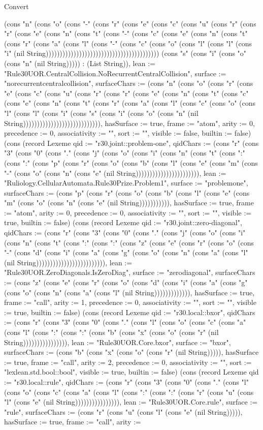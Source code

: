 \begin{lexlean}{Convert}
\begin{semanticmodule}
{(cons "n" (cons "o" (cons "-" (cons "r" (cons "e" (cons "c" (cons "u" (cons "r" (cons "r" (cons "e" (cons "n" (cons "t" (cons "-" (cons "c" (cons "e" (cons "n" (cons "t" (cons "r" (cons "a" (cons "l" (cons "-" (cons "c" (cons "o" (cons "l" (cons "l" (cons "i" (nil String))))))))))))))))))))))))))))))))))))))))) (cons "s" (cons "i" (cons "o" (cons "n" (nil String))))) : (List String)), lean := "Rule30UOR.CentralCollision.NoRecurrentCentralCollision", surface := "norecurrentcentralcollision", surfaceChars := (cons "n" (cons "o" (cons "r" (cons "e" (cons "c" (cons "u" (cons "r" (cons "r" (cons "e" (cons "n" (cons "t" (cons "c" (cons "e" (cons "n" (cons "t" (cons "r" (cons "a" (cons "l" (cons "c" (cons "o" (cons "l" (cons "l" (cons "i" (cons "s" (cons "i" (cons "o" (cons "n" (nil String)))))))))))))))))))))))))))), hasSurface := true, frame := "atom", arity := 0, precedence := 0, associativity := "", sort := "", visible := false, builtin := false}) (cons (record Lexeme {qid := "r30.joint::problem-one", qidChars := (cons "r" (cons "3" (cons "0" (cons "." (cons "j" (cons "o" (cons "i" (cons "n" (cons "t" (cons ":" (cons ":" (cons "p" (cons "r" (cons "o" (cons "b" (cons "l" (cons "e" (cons "m" (cons "-" (cons "o" (cons "n" (cons "e" (nil String))))))))))))))))))))))), lean := "Ruliology.CellularAutomata.Rule30Prize.Problem1", surface := "problemone", surfaceChars := (cons "p" (cons "r" (cons "o" (cons "b" (cons "l" (cons "e" (cons "m" (cons "o" (cons "n" (cons "e" (nil String))))))))))), hasSurface := true, frame := "atom", arity := 0, precedence := 0, associativity := "", sort := "", visible := true, builtin := false}) (cons (record Lexeme {qid := "r30.joint::zero-diagonal", qidChars := (cons "r" (cons "3" (cons "0" (cons "." (cons "j" (cons "o" (cons "i" (cons "n" (cons "t" (cons ":" (cons ":" (cons "z" (cons "e" (cons "r" (cons "o" (cons "-" (cons "d" (cons "i" (cons "a" (cons "g" (cons "o" (cons "n" (cons "a" (cons "l" (nil String))))))))))))))))))))))))), lean := "Rule30UOR.ZeroDiagonals.IsZeroDiag", surface := "zerodiagonal", surfaceChars := (cons "z" (cons "e" (cons "r" (cons "o" (cons "d" (cons "i" (cons "a" (cons "g" (cons "o" (cons "n" (cons "a" (cons "l" (nil String))))))))))))), hasSurface := true, frame := "call", arity := 1, precedence := 0, associativity := "", sort := "", visible := true, builtin := false}) (cons (record Lexeme {qid := "r30.local::bxor", qidChars := (cons "r" (cons "3" (cons "0" (cons "." (cons "l" (cons "o" (cons "c" (cons "a" (cons "l" (cons ":" (cons ":" (cons "b" (cons "x" (cons "o" (cons "r" (nil String)))))))))))))))), lean := "Rule30UOR.Core.bxor", surface := "bxor", surfaceChars := (cons "b" (cons "x" (cons "o" (cons "r" (nil String))))), hasSurface := true, frame := "call", arity := 2, precedence := 0, associativity := "", sort := "lexlean.std.bool::bool", visible := true, builtin := false}) (cons (record Lexeme {qid := "r30.local::rule", qidChars := (cons "r" (cons "3" (cons "0" (cons "." (cons "l" (cons "o" (cons "c" (cons "a" (cons "l" (cons ":" (cons ":" (cons "r" (cons "u" (cons "l" (cons "e" (nil String)))))))))))))))), lean := "Rule30UOR.Core.rule", surface := "rule", surfaceChars := (cons "r" (cons "u" (cons "l" (cons "e" (nil String))))), hasSurface := true, frame := "call", arity := }
\end{semanticmodule}
\end{lexlean}
